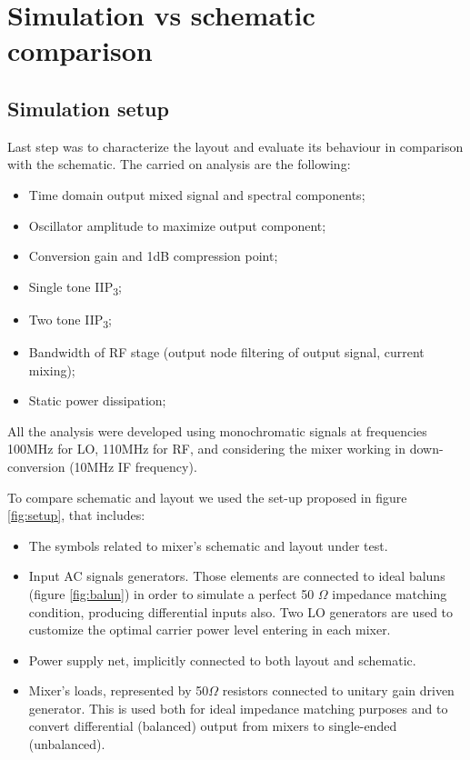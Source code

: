 \section{Simulation vs schematic comparison}

\subsection{Simulation setup}
Last step was to characterize the layout and evaluate its behaviour in comparison with the schematic. The carried on analysis are the following:
\begin{itemize}
	\item Time domain output mixed signal and spectral components;
	\item Oscillator amplitude to maximize output component;
	\item Conversion gain and 1dB compression point;
	\item Single tone IIP\textsubscript{3};
	\item Two tone IIP\textsubscript{3};
	\item Bandwidth of RF stage (output node filtering of output signal, current mixing);
	\item Static power dissipation;
\end{itemize}
All the analysis were developed using monochromatic signals at frequencies 100MHz for LO, 110MHz for RF, and considering the mixer working in down-conversion (10MHz IF frequency).

To compare schematic and layout we used the set-up proposed in figure \ref{fig:setup}, that includes:
\begin{itemize}
	\item The symbols related to mixer's schematic and layout under test.
	\item Input AC signals generators. Those elements are connected to ideal baluns (figure \ref{fig:balun}) in order to simulate a perfect 50 \(\Omega\) impedance matching condition, producing differential inputs also. Two LO generators are used to customize the optimal carrier power level entering in each mixer.
	\item Power supply net, implicitly connected to both layout and schematic.
	\item Mixer's loads, represented by 50\(\Omega\) resistors connected to unitary gain driven generator. This is used both for ideal impedance matching purposes and to convert differential (balanced) output from mixers to single-ended (unbalanced).
\end{itemize}

